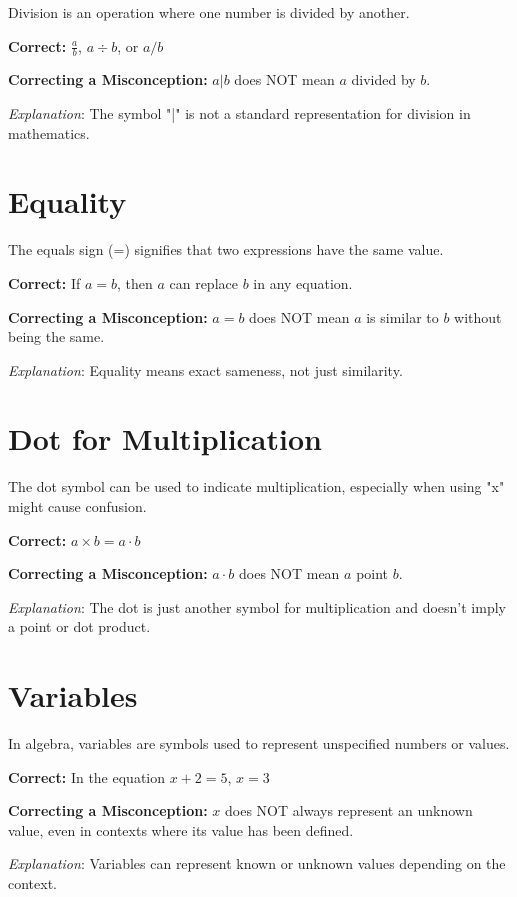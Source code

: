 \documentclass[12pt]{article}
\begin{document}
Division is an operation where one number is divided by another.

\textbf{Correct:} \(\frac{a}{b}\), \(a \div b\), or \(a/b\)

\textbf{Correcting a Misconception:} \(a|b\) does NOT mean \(a\) divided by \(b\).

\textit{Explanation}: The symbol "|" is not a standard representation for division in mathematics.

\section*{Equality}

The equals sign (=) signifies that two expressions have the same value.

\textbf{Correct:} If \(a = b\), then \(a\) can replace \(b\) in any equation.

\textbf{Correcting a Misconception:} \(a = b\) does NOT mean \(a\) is similar to \(b\) without being the same.

\textit{Explanation}: Equality means exact sameness, not just similarity.

\section*{Dot for Multiplication}

The dot symbol can be used to indicate multiplication, especially when using "x" might cause confusion.

\textbf{Correct:} \(a \times b = a \cdot b\)

\textbf{Correcting a Misconception:} \(a \cdot b\) does NOT mean \(a\) point \(b\).

\textit{Explanation}: The dot is just another symbol for multiplication and doesn't imply a point or dot product.

\section*{Variables}

In algebra, variables are symbols used to represent unspecified numbers or values.

\textbf{Correct:} In the equation \(x + 2 = 5\), \(x = 3\)

\textbf{Correcting a Misconception:} \(x\) does NOT always represent an unknown value, even in contexts where its value has been defined.

\textit{Explanation}: Variables can represent known or unknown values depending on the context.
\end{document}
